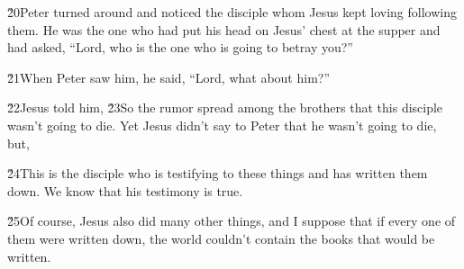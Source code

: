 \v{20}Peter turned around and noticed the disciple whom Jesus kept loving following them. He was the one who had put his head on Jesus' chest at the supper and had asked, ``Lord, who is the one who is going to betray you?''

\v{21}When Peter saw him, he said, ``Lord, what about him?''

\v{22}Jesus told him,  \v{23}So the rumor spread among the brothers that this disciple wasn't going to die. Yet Jesus didn't say to Peter that he wasn't going to die, but, 

\v{24}This is the disciple who is testifying to these things and has written them down. We know that his testimony is true.

\v{25}Of course, Jesus also did many other things, and I suppose that if every one of them were written down, the world couldn't contain the books that would be written.
